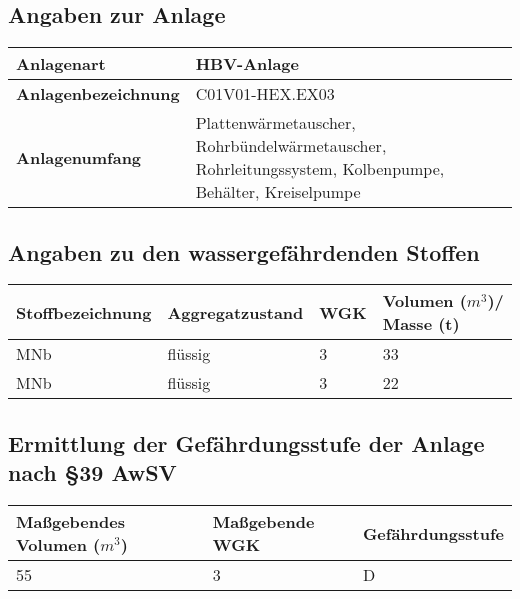 \documentclass{article}
\begin{document}
\subsection*{Angaben zur Anlage}

\begin{table}[H]
    \centering
    \begin{tabularx}{\textwidth}{|l|X|}
        \hline
        \textbf{Anlagenart} & HBV-Anlage \\
        \hline
        \textbf{Anlagenbezeichnung} & C01V01-HEX.EX03 \\
        \hline
        \textbf{Anlagenumfang} & Plattenwärmetauscher, Rohrbündelwärmetauscher, Rohrleitungssystem, Kolbenpumpe, Behälter, Kreiselpumpe \\
        \hline
    \end{tabularx}
\end{table}

\subsection*{Angaben zu den wassergefährdenden Stoffen}

\begin{table}[H]
    \centering
    \begin{tabularx}{\textwidth}{|X|X|X|X|}
        \hline
        \textbf{Stoffbezeichnung} & \textbf{Aggregatzustand} & \textbf{WGK} & \textbf{Volumen ($m^3$)/ \newline Masse (t)} \\
        \hline
        MNb & flüssig & 3 & 33 \\
        \hline
        MNb & flüssig & 3 & 22 \\
        \hline
    \end{tabularx}
\end{table}

\subsection*{Ermittlung der Gefährdungsstufe der Anlage nach §39 AwSV}

\begin{table}[H]
    \centering
    \begin{tabularx}{\textwidth}{|X|X|X|}
        \hline
        \textbf{Maßgebendes Volumen ($m^3$)} & \textbf{Maßgebende WGK} & \textbf{Gefährdungsstufe} \\
        \hline
        55 & 3 & D \\
        \hline
    \end{tabularx}
\end{table}
\end{document}
